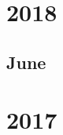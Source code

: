 \documentclass[12pt]{article}
\begin{document}
\newpage
\section{2018}
\subsection{June}
\begin{refsection}
    \nocite{radford_improving_nodate}
    \printbibliography[heading=none]
\end{refsection}


\newpage
\section{2017}
\begin{refsection}
    \nocite{vaswani2023attentionneed}
    \printbibliography[heading=none]
\end{refsection}
\end{document}
